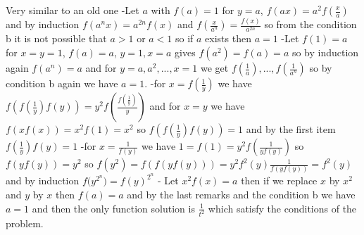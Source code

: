 \begin{solution}
	Very similar to an old one 
-Let $a$ with $f(a)=1$ for $y=a$, $f(ax)=a^2f(\frac{x}{a})$ and by induction $f(a^nx)=a^{2n}f(x)$ and $f(\frac{x}{a^n})=\frac{f(x)}{a^{2n}}$ so from the condition b it is not possible that $a>1$ or $a<1$ so if $a$ exists then $a=1$
-Let $f(1)=a$ for  $x=y=1$, $f(a)=a$, $y=1,x=a$ gives $f(a^2)=f(a)=a$ so by induction again $f(a^n)=a$ and for $y=a,a^2,...,x=1$ we get $f(\frac{1}{a}),...,f(\frac{1}{a^n})$ so by condition b again we have $a=1$.
-for $x=f(\frac{1}{y})$ we have $f(f(\frac{1}{y})f(y))=y^2f(\frac{f(\frac{1}{y})}{y})$ and for $x=y$ we have $f(xf(x))=x^2f(1)=x^2$ so $f(f(\frac{1}{y})f(y))=1$ and by the first item $f(\frac{1}{y})f(y)=1$ 
-for $x=\frac{1}{f(y)}$ we have  $1=f(1)=y^2f(\frac{1}{yf(y)})$ so $f(yf(y))=y^2$ so $f(y^2)=f(f(yf(y)))=y^2f^2(y)\frac{1}{f(yf(y))}=f^2(y)$ and by induction ${{f(y^{2^n}})=f(y)^{2^n}}$
- Let $x^2f(x)=a$ then if we replace $x$ by $x^2$ and $y$ by $x$ then $f(a)=a$ and by the last remarks and the condition b we have $a=1$ and then the only function solution is $\frac{1}{t^2}$ which satisfy the conditions of the problem.
\end{solution}



